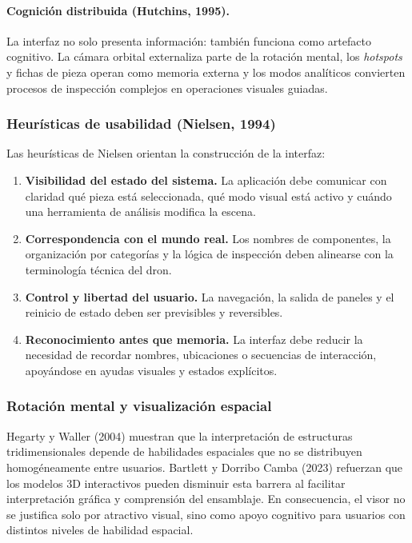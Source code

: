 \paragraph{Cognici\'on distribuida (Hutchins, 1995).} La interfaz no solo presenta informaci\'on: tambi\'en funciona como artefacto cognitivo. La c\'amara orbital externaliza parte de la rotaci\'on mental, los \textit{hotspots} y fichas de pieza operan como memoria externa y los modos anal\'iticos convierten procesos de inspecci\'on complejos en operaciones visuales guiadas.

\subsubsection{Heur\'isticas de usabilidad (Nielsen, 1994)}

Las heur\'isticas de Nielsen orientan la construcci\'on de la interfaz:
\begin{enumerate}
    \item \textbf{Visibilidad del estado del sistema.} La aplicaci\'on debe comunicar con claridad qu\'e pieza est\'a seleccionada, qu\'e modo visual est\'a activo y cu\'ando una herramienta de an\'alisis modifica la escena.
    \item \textbf{Correspondencia con el mundo real.} Los nombres de componentes, la organizaci\'on por categor\'ias y la l\'ogica de inspecci\'on deben alinearse con la terminolog\'ia t\'ecnica del dron.
    \item \textbf{Control y libertad del usuario.} La navegaci\'on, la salida de paneles y el reinicio de estado deben ser previsibles y reversibles.
    \item \textbf{Reconocimiento antes que memoria.} La interfaz debe reducir la necesidad de recordar nombres, ubicaciones o secuencias de interacci\'on, apoy\'andose en ayudas visuales y estados expl\'icitos.
\end{enumerate}

\subsubsection{Rotaci\'on mental y visualizaci\'on espacial}

Hegarty y Waller (2004) muestran que la interpretaci\'on de estructuras tridimensionales depende de habilidades espaciales que no se distribuyen homog\'eneamente entre usuarios. Bartlett y Dorribo Camba (2023) refuerzan que los modelos 3D interactivos pueden disminuir esta barrera al facilitar interpretaci\'on gr\'afica y comprensi\'on del ensamblaje. En consecuencia, el visor no se justifica solo por atractivo visual, sino como apoyo cognitivo para usuarios con distintos niveles de habilidad espacial.

